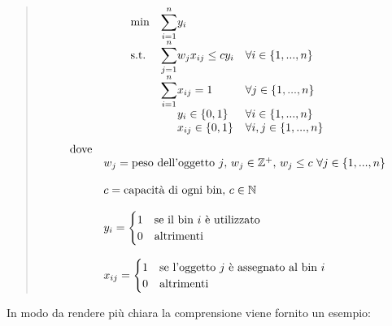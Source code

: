\begin{quote}	
	\begin{equation*}
		\begin{array}{ll@{}ll}
			\text{min}  & \displaystyle\sum\limits_{i=1}^{n} & y_i 					  & \\
			\text{s.t.} & \displaystyle\sum\limits_{j=1}^{n} & w_j x_{ij} \leq c y_i  & \forall i \in \{1, ..., n\}    \\
		                & \displaystyle\sum\limits_{i=1}^{n} & x_{ij} = 1 			  & \forall j \in \{1, ..., n\}    \\
		             	& 								     & y_{i} \in \{0,1\}	  & \forall i \in \{1, ..., n\}    \\
		                & 								     & x_{ij} \in \{0,1\}  	  & \forall i, j \in \{1, ..., n\} \\
		\end{array}
	\end{equation*}
	\begin{equation*}
		\begin{array}{ll@{}ll}
	    	\text{dove} &									& \\
	    				& w_j = \text{peso dell'oggetto } j	\text{, } w_j \in \mathbb{Z}^+ \text{, } w_j \leq c \text{ } \forall j \in \{1, ..., n\}  & \\ \\ 
		    			& c = \text{capacità di ogni bin, } c \in \mathbb{N} & \\ \\
		    			& y_i = 
		    				\begin{cases}
    							1 & \text{se il bin } i \text{ è utilizzato} \\
    							0 & \text{altrimenti}
							\end{cases}					    & \\ \\
						& x_{ij} = 
							\begin{cases}
    							1 & \text{se l'oggetto } j \text{ è assegnato al bin } i \\
    							0 & \text{altrimenti}
							\end{cases}					    & \\
		\end{array}
	\end{equation*}
\end{quote}
\noindent
In modo da rendere più chiara la comprensione viene fornito un esempio:
